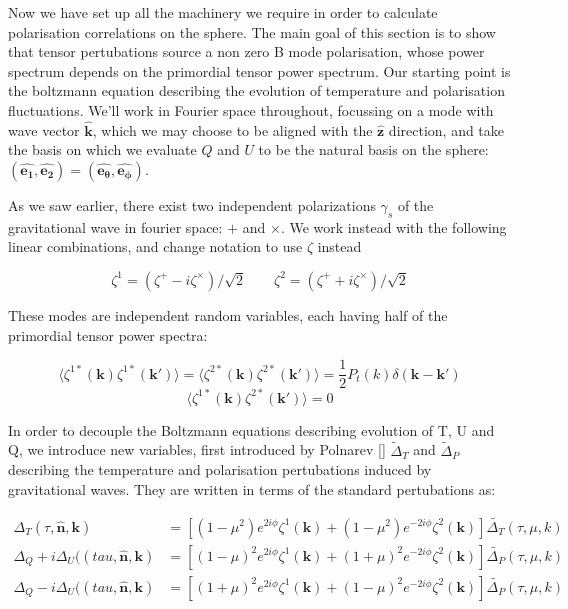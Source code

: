 \documentclass[a4paper,11pt]{article}
\renewcommand{\v}[1]{\mathbf{#1}}
\newcommand{\half}{\frac{1}{2}}
\newcommand{\unit}[1]{\hat{\v{#1}}}
\begin{document}
Now we have set up all the machinery we require in order to calculate polarisation correlations on the sphere. The main goal of this section is to show that tensor pertubations source a non zero B mode polarisation, whose power spectrum depends on the primordial tensor power spectrum. Our starting point is the boltzmann equation describing the evolution of temperature and polarisation fluctuations.  We'll work in Fourier space throughout, focussing on a mode with wave vector $\unit{k}$, which we may choose to be aligned with the $\unit{z}$ direction, and take the basis on which we evaluate $Q$ and $U$ to be the natural basis on the sphere: $(\unit{e_1}, \unit{e_2}) = (\unit{e_\theta}, \unit{e_\phi})$.

As we saw earlier, there exist two independent polarizations $\gamma_s$ of the gravitational wave in fourier space: $+$ and $\times$. We work instead with the following linear combinations, and change notation to use $\zeta$ instead

\begin{equation}
\zeta^1 = (\zeta^+ - i\zeta^\times)/\sqrt{2} \qquad \zeta^2 = (\zeta^+ + i\zeta^\times)/\sqrt{2}
\end{equation}

These modes are independent random variables, each having half of the primordial tensor power spectra:

\begin{equation}
\langle \zeta^{1*}(\v{k})\zeta^{1*}(\v{k'})\rangle=\langle \zeta^{2*}(\v{k})\zeta^{2*}(\v{k'})\rangle=\half P_t(k)\delta(\v{k}-\v{k'})
\end{equation}
\begin{equation}
\langle \zeta^{1*}(\v{k})\zeta^{2*}(\v{k'})\rangle=0
\end{equation}

In order to decouple the Boltzmann equations describing evolution of T, U and Q, we introduce new variables, first introduced by Polnarev [] $\tilde{\Delta}_T$ and $\tilde{\Delta}_P$ describing the temperature and polarisation pertubations induced by gravitational waves. They are written in terms of the standard pertubations as:

\begin{align}
\Delta_T(\tau,\unit{n},\v{k}) &= [(1-\mu^2) e^{2i\phi} \zeta^1(\v{k})+(1-\mu^2) e^{-2i\phi} \zeta^2(\v{k})]\tilde{\Delta_T}(\tau,\mu,k)\\
\Delta_Q+i\Delta_U((tau,\unit{n},\v{k}) &=[(1-\mu)^2 e^{2i\phi} \zeta^1(\v{k})+(1+\mu)^2 e^{-2i\phi} \zeta^2(\v{k})]\tilde{\Delta_P}(\tau,\mu,k) \\
\Delta_Q-i\Delta_U((tau,\unit{n},\v{k}) &=[(1+\mu)^2 e^{2i\phi} \zeta^1(\v{k})+(1-\mu)^2 e^{-2i\phi} \zeta^2(\v{k})]\tilde{\Delta_P}(\tau,\mu,k)
\end{align}
\end{document}
